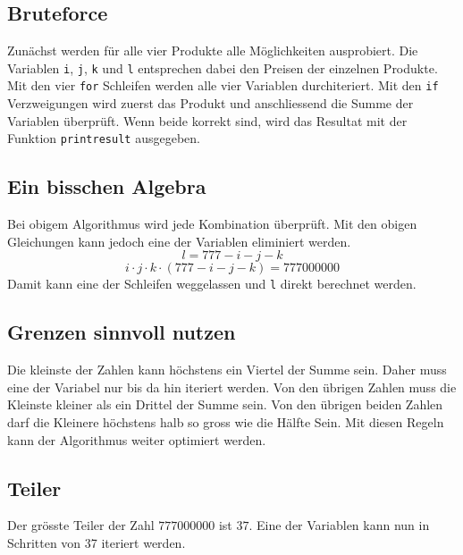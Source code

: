 \documentclass[10pt, fleqn]{article}
\begin{document}
\subsection{Bruteforce}
Zunächst werden für alle vier Produkte alle Möglichkeiten ausprobiert. Die 
Variablen \verb!i!, \verb!j!, \verb!k! und \verb!l! entsprechen dabei den 
Preisen der einzelnen Produkte. \\
Mit den vier \verb!for! Schleifen werden alle vier Variablen durchiteriert. 
Mit den \verb!if! Verzweigungen wird zuerst das Produkt und anschliessend die 
Summe der Variablen überprüft. Wenn beide korrekt sind, wird das Resultat 
mit der Funktion \verb!printresult! ausgegeben. 
% 

\subsection{Ein bisschen Algebra}
Bei obigem Algorithmus wird jede Kombination überprüft. Mit den obigen 
Gleichungen kann jedoch eine der Variablen eliminiert werden. 
\[ l = 777 - i - j - k \]
\[ i \cdot j \cdot k \cdot (777 - i - j - k) = 777000000 \]
Damit kann eine der Schleifen weggelassen und \verb!l! direkt berechnet werden. 
% 

\subsection{Grenzen sinnvoll nutzen}
Die kleinste der Zahlen kann höchstens ein Viertel der Summe sein. Daher muss 
eine der Variabel nur bis da hin iteriert werden. Von den übrigen Zahlen muss 
die Kleinste kleiner als ein Drittel der Summe sein. Von den übrigen beiden 
Zahlen darf die Kleinere höchstens halb so gross wie die Hälfte Sein. Mit 
diesen Regeln kann der Algorithmus weiter optimiert werden. 
% 

\subsection{Teiler}
Der grösste Teiler der Zahl $777000000$ ist $37$. Eine der Variablen kann nun 
in Schritten von 37 iteriert werden. 
% 
\end{document}
